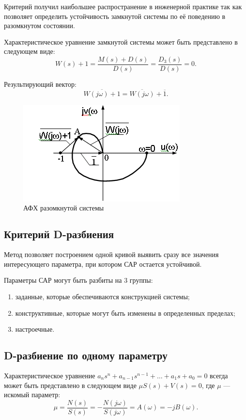 \documentclass[unicode, 12pt, a4paper, oneside]{article}
\begin{document}
Критерий получил наибольшее распространение в инженерной практике так как позволяет определить устойчивость замкнутой системы по её поведению в разомкнутом состоянии.

Характеристическое уравнение замкнутой системы может быть представлено в следующем виде:
\begin{equation}
W(s) + 1 = \dfrac{M(s) + D(s)}{D(s)} = \dfrac{D_3(s)}{D(s)} = 0.
\end{equation} %

Результирующий вектор:
\begin{equation}
\overline{W(j\omega) + 1} = \overline{W(j\omega)} + \overline{1}.
\end{equation}

\begin{figure}[H]
\centering
\includegraphics[width=0.3\linewidth]{27_mih_nike.png}
\caption{АФХ разомкнутой системы}
\end{figure}

\subsection*{Критерий  D-разбиения}

Метод позволяет построением одной кривой выявить сразу все значения интересующего параметра, при котором САР остается устойчивой.

Параметры САР могут быть разбиты на 3 группы:
\begin{enumerate}
\item заданные, которые обеспечиваются конструкцией системы;
\item конструктивные, которые могут быть изменены в определенных пределах;
\item настроечные.
\end{enumerate}

\subsection*{D-разбиение по одному параметру}

Характеристическое уравнение $ a_n s^n + a_{n-1} s^{n-1} + \ldots + a_1 s + a_0 = 0 $ всегда может быть представлено в следующем виде $ \mu S(s) + V(s) = 0 $, где $ \mu $ --- искомый параметр:
\begin{equation}
\mu = \dfrac{N(s)}{S(s)} = -\dfrac{N(j\omega)}{S(j\omega)} = A(\omega) = -jB(\omega).
\end{equation}
\end{document}
